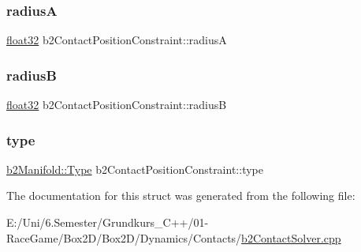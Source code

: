 \subsubsection{\texorpdfstring{radiusA}{radiusA}}
{\footnotesize\ttfamily \mbox{\hyperlink{b2_settings_8h_aacdc525d6f7bddb3ae95d5c311bd06a1}{float32}} b2\+Contact\+Position\+Constraint\+::radiusA}

\mbox{\label{structb2_contact_position_constraint_a066db66f0b944b92c2666271e88e4540}} 
\subsubsection{\texorpdfstring{radiusB}{radiusB}}
{\footnotesize\ttfamily \mbox{\hyperlink{b2_settings_8h_aacdc525d6f7bddb3ae95d5c311bd06a1}{float32}} b2\+Contact\+Position\+Constraint\+::radiusB}

\mbox{\label{structb2_contact_position_constraint_a09f96db1c3fe5ede24395e2431e95103}} 
\subsubsection{\texorpdfstring{type}{type}}
{\footnotesize\ttfamily \mbox{\hyperlink{structb2_manifold_aa9c347e2ff2e27ee820a926efbb33e12}{b2\+Manifold\+::\+Type}} b2\+Contact\+Position\+Constraint\+::type}



The documentation for this struct was generated from the following file\+:\begin{DoxyCompactItemize}
\item 
E\+:/\+Uni/6.\+Semester/\+Grundkurs\+\_\+\+C++/01-\/\+Race\+Game/\+Box2\+D/\+Box2\+D/\+Dynamics/\+Contacts/\mbox{\hyperlink{b2_contact_solver_8cpp}{b2\+Contact\+Solver.\+cpp}}\end{DoxyCompactItemize}
